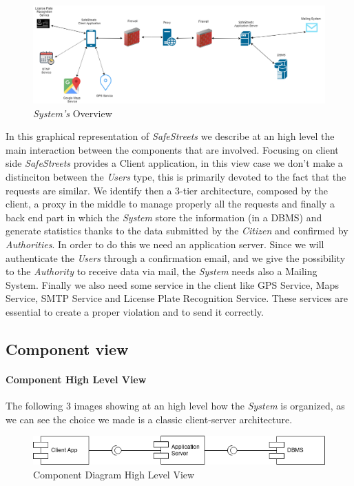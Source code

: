 \documentclass{article}
\begin{document}
\begin{figure}[H]
    \centering
    \includegraphics[scale=0.3]{img/overview.png}
    \caption{\textit{System's} Overview}
\end{figure}

In this graphical representation of \textit{SafeStreets} we describe at an high level the main interaction
between the components that are involved. Focusing on client side \textit{SafeStreets} provides a Client 
application, in this view case we don't make a distinciton between the \textit{Users} type, this is 
primarily devoted to the fact that the requests are similar. We identify then a 3-tier architecture, 
composed by the client, a proxy in the middle to manage properly all the requests and finally a back 
end part in which the \textit{System} store the information (in a DBMS) and generate statistics thanks
to the data submitted by the \textit{Citizen} and confirmed by \textit{Authorities}. In order to do this
we need an application server. Since we will authenticate the \textit{Users} through a confirmation email, 
and we give the possibility to the \textit{Authority} to receive data via mail, the \textit{System} needs
also a Mailing System. Finally we also need some service in the client like GPS Service, Maps Service,
SMTP Service and License Plate Recognition Service. These services are essential to create a proper violation
and to send it correctly.

\clearpage
\subsection{Component view}

\paragraph{Component High Level View}
The following 3 images showing at an high level how the \textit{System} is organized, as we can see the
choice we made is a classic client-server architecture. 

\begin{figure}[H]
    \centering
    \includegraphics[scale=0.4]{img/component_diagrams/component_diagram.png}
    \caption{Component Diagram High Level View}
\end{figure}
\end{document}
